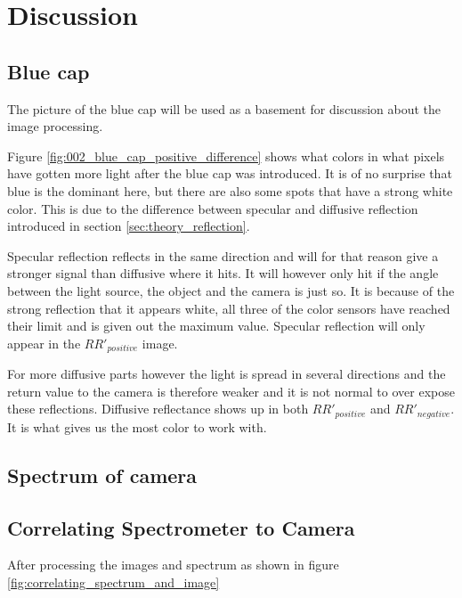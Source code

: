 \section{Discussion}

\subsection{Blue cap}
\label{sec:blue_cap_discussion}
The picture of the blue cap will be used as a basement for discussion about the image processing. 

Figure \ref{fig:002_blue_cap_positive_difference} shows what colors in what pixels have gotten more light after the blue cap was introduced. It is of no surprise that blue is the dominant here, but there are also some spots that have a strong white color. This is due to the difference between specular and diffusive reflection introduced in section \ref{sec:theory_reflection}. 

Specular reflection reflects in the same direction and will for that reason give a stronger signal than diffusive where it hits. It will however only hit if the angle between the light source, the object and the camera is just so. It is because of the strong reflection that it appears white, all three of the color sensors have reached their limit and is given out the maximum value. Specular reflection will only appear in the $RR'_{positive}$ image. 

For more diffusive parts however the light is spread in several directions and the return value to the camera is therefore weaker and it is not normal to over expose these reflections. Diffusive reflectance shows up in both $RR'_{positive}$ and $RR'_{negative}$. It is what gives us the most color to work with. 


\subsection{Spectrum of camera}

\subsection{Correlating Spectrometer to Camera}

After processing the images and spectrum as shown in figure \ref{fig:correlating_spectrum_and_image} 

